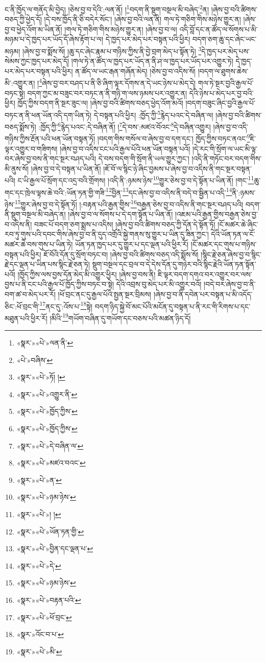 ང་ནི་ཁྱོད་ལ་གནོད་མི་བྱེད། །ཅེས་བྱ་བ་དེའི་:ལན་ནོ། །\footnote{«སྣར་»«པེ་»ལན་ནི་}བདག་ནི་སྡུག་བསྔལ་མི་བཞེད་\footnote{«པེ་»བཞིས་}ན། །ཞེས་བྱ་བའི་ཚིགས་བཅད་ཀྱི་ཕྱེད་དོ། །དེ་བས་ཁྱོད་ནི་ཅི་བདེར་སོང་། །ཞེས་བྱ་བའི་ལན་ནི། གལ་ཏེ་གཅིག་གིས་མཉེས་གྱུར་ན། །ཞེས་བྱ་བ་ཕྱེད་འོག་མ་ཡིན་ནོ། །གལ་ཏེ་གཅིག་གིས་མཉེས་གྱུར་ན། །ཞེས་བྱ་བ་ལ། འདི་བློ་དང་ན་ཚོད་ལ་སོགས་པ་མི་མཉམ་པ་དེ་ཁྱད་པར་ཡོད་དོ་ཞེས་རྟོག་པ་ལ། དེ་ཁྱད་པར་མེད་པར་བསྟན་པའི་ཕྱིར། བདག་ཅག་ཆུ་དང་ཞེང་ཡང་མཉམ། །ཞེས་བྱ་བ་སྨོས་སོ། །ཆུ་དང་ཞེང་རྣམ་པ་གཉིས་ཀྱིས་ནི་བྱེ་བྲག་མེད་པ་སྟོན་ཏེ། \footnote{«སྣར་»«པེ་»ཏོ། ། }དེ་ཁྱད་པར་མེད་པས་སེམས་ཀྱང་ཁྱད་པར་མེད་དོ། །གལ་ཏེ་ན་ཚོད་ལ་ཁྱད་པར་ཡོད་ན་ནི་ཤ་ལ་ཁྱད་པར་ཡོད་པར་འགྱུར་ཏེ། དེ་ཁྱད་པར་མེད་པར་བསྟན་པའི་ཕྱིར། ན་ཚོད་ལ་ཡང་རྒན་གཞོན་མེད། །ཅེས་བྱ་བ་འདིས་སོ། །བདག་ལ་ཐུགས་ཆེས་མི་:འགྱུར་ན། །\footnote{«སྣར་»«པེ་»འགྱུར་ནི་}ཞེས་བྱ་བར་བཤད་པ་ནི་ཅི་ཞིག་ལྟར་དོགས་ན་དེ་ཡང་ཉེས་པ་མེད་དེ། གལ་ཏེ་སྔར་བྱའི་རྒྱལ་པོ་བཏང་སྟེ། བདག་ཀྱང་མ་བཟུང་བར་བཏང་ན་ནི་གཉི་ག་ལས་ཉམས་པར་འགྱུར་ན། དེའི་ཉེས་པ་མེད་པར་བྱ་བའི་ཕྱིར། ཁྱོད་ཀྱིས་བདག་ནི་སྔར་ཟུང་ལ། །ཞེས་བྱ་བའི་ཚིགས་བཅད་ཕྱེད་འོག་མའོ། །བདག་བཟུང་ཞིང་བྱའི་རྒྱལ་པོ་བཏང་ན་ནི་ཕན་ཡོན་འདི་དག་ཡིན་ཏེ། དེ་བསྟན་པའི་ཕྱིར། :ཁྱོད་ཀྱི་\footnote{«སྣར་»«པེ་»ཁྱོད་ཀྱིས་}རྙེད་པའང་དེ་བཞིན་ལ། །ཞེས་བྱ་བའི་ཚིགས་བཅད་སྨོས་ཏེ། :ཁྱོད་ཀྱི་\footnote{«སྣར་»«པེ་»ཁྱོད་ཀྱིས་}རྙེད་པའང་:དེ་བཞིན་ནོ། །\footnote{«སྣར་»«པེ་»དེ་བཞིན་ལ་}དེ་བས་:མཛའ་བོའང་\footnote{«སྣར་»«པེ་»མཛའ་བའང་}དེ་བཞིན་འགྱུར། །ཞེས་བྱ་བ་འདི་གཉིས་ཀྱིས་རྔོན་པའི་ཕན་ཡོན་བསྟན་ཏོ། །བདག་གིས་གསོལ་བ་ཞེས་བྱ་བ་དག་དང་། ཁྱོད་ཀྱིས་བཏང་ནའང་\footnote{«སྣར་»«པེ་»ན་}ཇི་ལྟར་འགྱུར་བ་གཟིགས། །ཞེས་བྱ་བ་འདིས་ངང་པའི་རྒྱལ་པོའི་ཕན་ཡོན་བསྟན་པའོ། །དེ་རང་གི་སྲོག་ལ་ཡང་མི་ལྟ་བར་ཞེས་བྱ་བས་ནི་གང་སྔར་བཤད་པའི། དེ་བས་བདག་གི་སྲོག་ནི་ཡལ་གྱུར་ཀྱང་། །འདི་ནི་གཏོང་བར་བདག་གིས་མི་ནུས་སོ། །ཞེས་བྱ་བ་དེ་བསྟན་པ་ཡིན་ནོ། །ཇོ་བོ་ལ་སྙིང་ཉེ་ཞིང་བྱམས་པ་ཞེས་བྱ་བ་འདིས་ནི་གང་སྔར་བསྟན་པའི། ང་ཡི་རྒྱལ་པོ་སྲོག་དང་འདྲ་བའི་གྲོགས། །འདི་ནི་:ཉམས་ཉེས་\footnote{«སྣར་»«པེ་»ཉམ་ཉེས་}གྱུར་ཅེས་བྱ་བ་དེ་སྟོན་པ་ཡིན་ནོ། །གང་\footnote{«སྣར་»«པེ་»། །}ཆུ་གང་དང་ཁྲེལ་ལྟས་ཆེ་བའི་:ཡོན་ཏན་གྱི་གཟི་\footnote{«སྣར་»«པེ་»ཡོན་ཏན་གྱི་}བྱིན་\footnote{«སྣར་»«པེ་»བྱིན་དང་ལྡན་པ་}དང་ཞེས་བྱ་བ་འདིས་ནི་བདེ་བ་སྦྱིན་པ་འདི་\footnote{«སྣར་»«པེ་»དེ་}ནི་:ཉམས་ཉེས་\footnote{«སྣར་»«པེ་»ཉམ་ཉེས་}གྱུར་ཞེས་བྱ་བ་དེ་སྟོན་ཏོ། །:བརྟན་པའི་རྒྱན་གྱིས་\footnote{«སྣར་»«པེ་»བརྟན་པའི་}བརྒྱན་ཅེས་བྱ་བ་འདིས་ནི་གང་སྔར་བཤད་པའི། བདག་ནི་སྡུག་བསྔལ་མི་བཞེད་ན། །ཞེས་བྱ་བ་ལ་སོགས་པ་དེ་དག་སྟོན་པ་ཡིན་ནོ། །འཇམ་པའི་རྒྱན་གྱིས་བརྒྱན་ཅེས་བྱ་བ་འདིས་ནི། བཟང་པོ་བདག་ཅག་སྨྲས་པ་འདིས། །ཞེས་བྱ་བའི་ཚིགས་བཅད་ཀྱི་དོན་དེ་སྟོན་ཏོ། །ངོ་མཚར་ཆེ་ཞིང་རབ་ཏུ་གུས་པའི་དབང་གིས་ཞེས་བྱ་བ་ནི་དུད་འགྲོའི་སྐྱེ་གནས་སུ་གྱུར་པ་ཡིན་དུ་ཟིན་ཀྱང་། དེའི་ཡོན་ཏན་ལ་ངོ་མཚར་ཆེ་བས་གུས་པ་ཡིན་ཏེ། ཡོན་ཏན་ཁྱད་པར་དུ་གྱུར་པ་དང་ལྡན་པའི་ཕྱིར་རོ། །ངོ་མཚར་དང་གུས་པ་གཉིས་བསྟན་པའི་ཕྱིར། ཇོ་བོའི་དོན་དུ་སྲོག་བཏང་བ། །ཞེས་བྱ་བའི་ཚིགས་བཅད་འདི་སྨོས་སོ། །སྙིང་རྗེ་ཅན་ཞེས་བྱ་བ་སྙིང་རྗེ་དང་ལྡན་པ་ཡིན་པས་སྙིང་རྗེ་ཅན་ཏེ། སྡུག་བསྔལ་དང་བྲལ་བ་དེ་དེས་དོན་དུ་གཉེར་བའི་སྙིང་རྗེའི་ཡོན་ཏན་སྟོན་པའོ། །ཁྱོད་ཀྱིས་ལས་བྱས་དོན་མེད་མི་འགྱུར་ཕྱིར། །ཞེས་བྱ་བས་ནི། ཇི་ལྟར་བདག་དགའ་བར་འགྱུར་བར་ལས་བྱས་པ་ནི་ངང་པའི་རྒྱལ་པོ་ཁྱོད་ཀྱིས་བཏང་བ་སྟེ། དེའི་འབྲས་བུ་མེད་པར་མི་འགྱུར་བའོ། །བདེ་བར་ཞེས་བྱ་བ་ནི་བག་ཚ་བ་མེད་པར་རོ། །ཕོ་བྲང་ནང་དུ་རྒྱལ་པོའི་སྤྱན་སྔར་བྲིམས། །ཞེས་བྱ་བ་ནི་དབེན་པར་བསྟན་པ་མི་འདོད་ཅིང་:ཕོ་བྲང་གི་\footnote{«སྣར་»«པེ་»ཕོ་བྲང་}ནང་དུ་:འོས་པ་\footnote{«སྣར་»འོང་བ་པ་}སྟེ། བདག་ཉིད་སྐྱེ་བོ་མང་པོའི་མངོན་དུ་བསྟན་པ་ནི་རང་གི་རིགས་པ་དང་མཐུན་པའི་ཕྱིར་རོ། །མིའི་\footnote{«སྣར་»«པེ་»མི་}གཡོག་བཞིན་དུ་གཡོག་དང་བཅས་པའི་མཚན་ཉིད་དོ། 